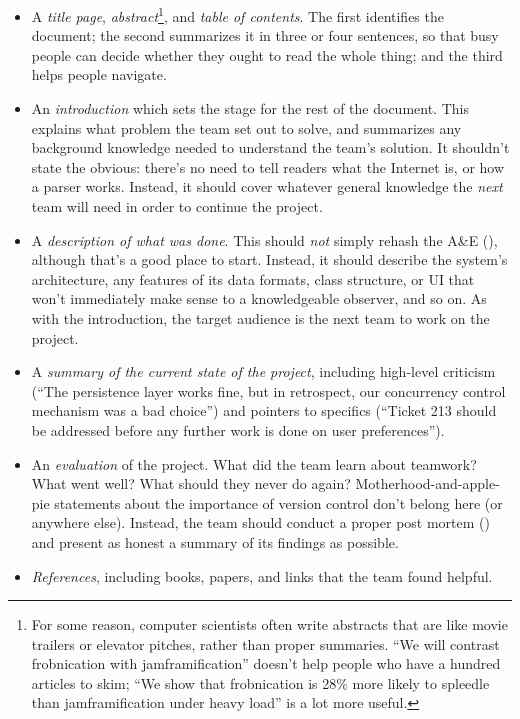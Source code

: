 \documentclass{report}
\begin{document}
\begin{itemize}

  \item A \emph{title page}, \emph{abstract}\footnote{For some reason,
  computer scientists often write abstracts that are like movie
  trailers or elevator pitches, rather than proper summaries. ``We
  will contrast frobnication with jamframification'' doesn't help
  people who have a hundred articles to skim; ``We show that
  frobnication is 28\% more likely to spleedle than jamframification
  under heavy load'' is a lot more useful.}, and \emph{table of
  contents}.  The first identifies the document; the second summarizes
  it in three or four sentences, so that busy people can decide
  whether they ought to read the whole thing; and the third helps
  people navigate.

  \item An \emph{introduction} which sets the stage for the rest of
  the document.  This explains what problem the team set out to solve,
  and summarizes any background knowledge needed to understand the
  team's solution.  It shouldn't state the obvious: there's no need to
  tell readers what the Internet is, or how a parser works.  Instead,
  it should cover whatever general knowledge the \emph{next} team will
  need in order to continue the project.

  \item A \emph{description of what was done}.  This should \emph{not}
  simply rehash the A\&E (), although
  that's a good place to start. Instead, it should describe the
  system's architecture, any features of its data formats, class
  structure, or UI that won't immediately make sense to a
  knowledgeable observer, and so on.  As with the introduction, the
  target audience is the next team to work on the project.

  \item A \emph{summary of the current state of the project},
  including high-level criticism (``The persistence layer works fine,
  but in retrospect, our concurrency control mechanism was a bad
  choice'') and pointers to specifics (``Ticket 213 should be
  addressed before any further work is done on user preferences'').

  \item An \emph{evaluation} of the project.  What did the team learn
  about teamwork?  What went well?  What should they never do again?
  Motherhood-and-apple-pie statements about the importance of version
  control don't belong here (or anywhere else).  Instead, the team
  should conduct a proper post mortem ()
  and present as honest a summary of its findings as possible.

  \item \emph{References}, including books, papers, and links that the
  team found helpful.

\end{itemize}
\end{document}
